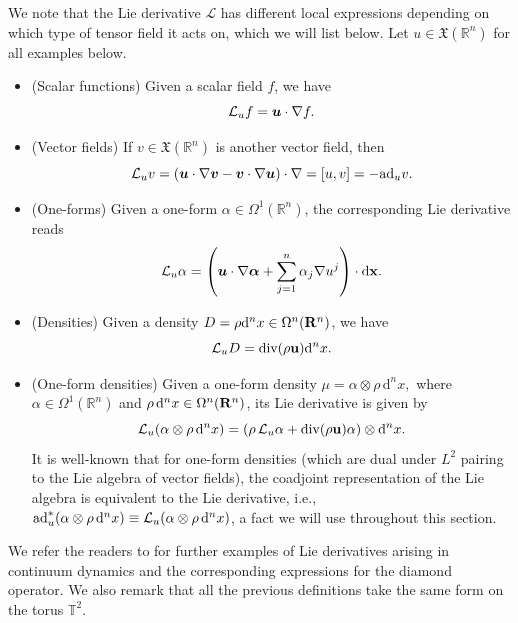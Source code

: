 \documentclass[11pt, oneside]{article}   	%
\numberwithin{equation}{section}
\theoremstyle{plain}
\theoremstyle{definition}
\theoremstyle{remark}
\newcommand{\<}{\langle}
\renewcommand{\>}{\rangle}
\def\RR{{\bf R}}
\def\u{{\bf{u}}}
\def\x{{\bf{x}}}
\def\div{{\textrm{div}}}
\def\rmd{{\mathrm{d}}}
\newcommand{\mb}[1]{\mbox{\boldmath{$#1$}}}
\begin{document}
We note that the Lie derivative $\mathcal L$ has different local expressions depending on which type of tensor field it acts on, which we will list below. Let $u \in \mathfrak X(\mathbb R^n)$ for all examples below.
\begin{itemize} 
    \item (Scalar functions) Given a scalar field $f$, we have
    $$\mathcal L_u f = \mb{u} \cdot \nabla f.$$
    \item (Vector fields) If $v \in \mathfrak X(\mathbb R^n)$ is another vector field, then
    $$\mathcal L_u v = \left(\mb{u}\cdot \nabla \mb{v} - \mb{v}\cdot \nabla \mb{u}\right)\cdot \nabla = [u,v] = -{\rm ad}_u v.$$
    \item (One-forms) Given a one-form $\alpha \in \Omega^1(\mathbb R^n)$, the corresponding Lie derivative reads
    $$\mathcal L_{u}\alpha = \left(\mb{u} \cdot \nabla \mb{\alpha} + \sum_{j=1}^n \alpha_j \nabla u^j\right) \cdot {\rmd} \x.$$
    \item (Densities) Given a density $D = \rho {\rmd}^nx \in \Omega^n(\RR^n)$, we have
    $$\mathcal L_{u} D = \div(\rho \u) {\rmd}^nx.$$
    \item (One-form densities) Given a one-form density $\mu = \alpha \otimes \rho\,{\rmd} ^nx,$ where $\alpha \in \Omega^1(\mathbb R^n)$ and $\rho\,{\rmd}^nx \in \Omega^n(\RR^n)$, its Lie derivative is given by
    $$\mathcal{L}_u (\alpha \otimes \rho\,{\rmd} ^nx) = (\rho\, \mathcal{L}_u \alpha + \div(\rho \u) \alpha) \otimes {\rmd} ^nx. $$
    It is well-known that for one-form densities (which are dual under $L^2$ pairing to the Lie algebra of vector fields), the coadjoint representation of the Lie algebra is equivalent to the Lie derivative, i.e., ${\rm ad}^*_u (\alpha \otimes \rho\,{\rmd} ^nx) \equiv \mathcal{L}_u (\alpha \otimes \rho\,{\rmd} ^nx)$, a fact we will use throughout this section.
\end{itemize}
We refer the readers to \cite{HMR1998} for further examples of Lie derivatives arising in continuum dynamics and the corresponding expressions for the diamond operator. We also remark that all the previous definitions take the same form on the torus $\mathbb{T}^2.$
\end{document}
